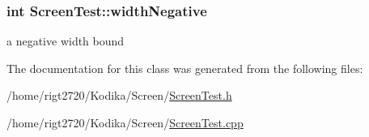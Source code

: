 \hypertarget{classScreenTest_a6dcea4998a473e9c5fbc7e3bfa074ab4}{
\subsubsection[{width\-Negative}]{\setlength{\rightskip}{0pt plus 5cm}int Screen\-Test\-::width\-Negative\hspace{0.3cm}{\ttfamily [private]}}}\label{classScreenTest_a6dcea4998a473e9c5fbc7e3bfa074ab4}


a negative width bound 



The documentation for this class was generated from the following files\-:\begin{DoxyCompactItemize}
\item 
/home/rigt2720/\-Kodika/\-Screen/\hyperlink{ScreenTest_8h}{Screen\-Test.\-h}\item 
/home/rigt2720/\-Kodika/\-Screen/\hyperlink{ScreenTest_8cpp}{Screen\-Test.\-cpp}\end{DoxyCompactItemize}
